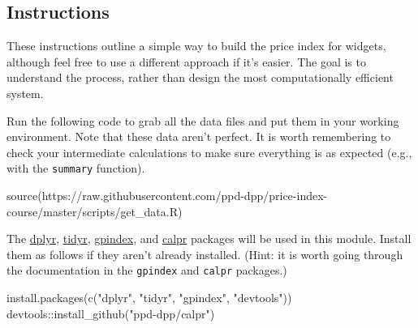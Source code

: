 \documentclass[
]{article}
\newenvironment{Shaded}{\begin{snugshade}}{\end{snugshade}}
\newcommand{\FunctionTok}[1]{\textcolor[rgb]{0.00,0.00,0.00}{#1}}
\newcommand{\NormalTok}[1]{#1}
\newcommand{\SpecialCharTok}[1]{\textcolor[rgb]{0.00,0.00,0.00}{#1}}
\newcommand{\StringTok}[1]{\textcolor[rgb]{0.31,0.60,0.02}{#1}}
\begin{document}
\hypertarget{instructions}{%
\subsection{Instructions}\label{instructions}}

These instructions outline a simple way to build the price index for widgets, although feel free to use a different approach if it's easier. The goal is to understand the process, rather than design the most computationally efficient system.

Run the following code to grab all the data files and put them in your working environment. Note that these data aren't perfect. It is worth remembering to check your intermediate calculations to make sure everything is as expected (e.g., with the \texttt{summary} function).

\begin{Shaded}
\begin{Highlighting}[]
\FunctionTok{source}\NormalTok{(}\StringTok{\textquotesingle{}https://raw.githubusercontent.com/ppd{-}dpp/price{-}index{-}course/master/scripts/get\_data.R\textquotesingle{}}\NormalTok{)}
\end{Highlighting}
\end{Shaded}

The \href{https://cran.r-project.org/package=dplyr}{dplyr}, \href{https://cran.r-project.org/package=tidyr}{tidyr}, \href{https://cran.r-project.org/package=gpindex}{gpindex}, and \href{https://github.com/ppd-dpp/calpr}{calpr} packages will be used in this module. Install them as follows if they aren't already installed. (Hint: it is worth going through the documentation in the \texttt{gpindex} and \texttt{calpr} packages.)

\begin{Shaded}
\begin{Highlighting}[]
\FunctionTok{install.packages}\NormalTok{(}\FunctionTok{c}\NormalTok{(}\StringTok{"dplyr"}\NormalTok{, }\StringTok{"tidyr"}\NormalTok{, }\StringTok{"gpindex"}\NormalTok{, }\StringTok{"devtools"}\NormalTok{))}
\NormalTok{devtools}\SpecialCharTok{::}\FunctionTok{install\_github}\NormalTok{(}\StringTok{"ppd{-}dpp/calpr"}\NormalTok{)}
\end{Highlighting}
\end{Shaded}
\end{document}
